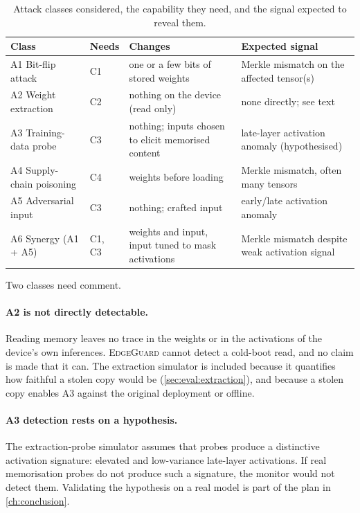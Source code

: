 \begin{table}[t]
\centering
\caption{Attack classes considered, the capability they need, and the signal expected to reveal
them.}
\label{tab:attack_classes}
\small
\begin{tabularx}{\textwidth}{@{}lp{1.1cm}Xp{3.6cm}@{}}
\toprule
\textbf{Class} & \textbf{Needs} & \textbf{Changes} & \textbf{Expected signal} \\
\midrule
A1 Bit-flip attack & C1 & one or a few bits of stored weights & Merkle mismatch on the affected tensor(s) \\
A2 Weight extraction & C2 & nothing on the device (read only) & none directly; see text \\
A3 Training-data probe & C3 & nothing; inputs chosen to elicit memorised content & late-layer activation anomaly (hypothesised) \\
A4 Supply-chain poisoning & C4 & weights before loading & Merkle mismatch, often many tensors \\
A5 Adversarial input & C3 & nothing; crafted input & early/late activation anomaly \\
A6 Synergy (A1 + A5) & C1, C3 & weights and input, input tuned to mask activations & Merkle mismatch despite weak activation signal \\
\bottomrule
\end{tabularx}
\end{table}

Two classes need comment.

\paragraph{A2 is not directly detectable.} Reading memory leaves no trace in the weights or in
the activations of the device's own inferences. \textsc{EdgeGuard} cannot detect a cold-boot
read, and no claim is made that it can. The extraction simulator is included because it
quantifies how faithful a stolen copy would be (\cref{sec:eval:extraction}), and because a
stolen copy enables A3 against the original deployment or offline.

\paragraph{A3 detection rests on a hypothesis.} The extraction-probe simulator assumes that
probes produce a distinctive activation signature: elevated and low-variance late-layer
activations. If real memorisation probes do not produce such a signature, the monitor would not
detect them. Validating the hypothesis on a real model is part of the plan in
\cref{ch:conclusion}.

